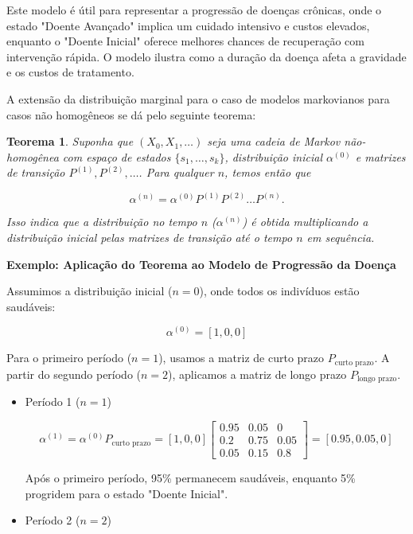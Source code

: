 \documentclass[12pt, a4paper, openany]{book}
\numberwithin{equation}{chapter}
\numberwithin{table}{chapter}
\numberwithin{figure}{chapter}
\theoremstyle{break}
\newtheorem{theorem}{Teorema}[section]
\begin{document}
Este modelo é útil para representar a progressão de doenças crônicas, onde o estado "Doente Avançado" implica um cuidado intensivo e custos elevados, enquanto o "Doente Inicial" oferece melhores chances de recuperação com intervenção rápida. O modelo ilustra como a duração da doença afeta a gravidade e os custos de tratamento.








A extensão da distribuição marginal para o caso de modelos markovianos para casos não homogêneos se dá pelo seguinte teorema:




\begin{theorem}
Suponha que \( (X_0, X_1, \dots) \) seja uma cadeia de Markov não-homogênea com espaço de estados \( \{s_1, \dots, s_k\} \), distribuição inicial \( \alpha^{(0)} \) e matrizes de transição \( P^{(1)}, P^{(2)}, \dots \). Para qualquer \( n \), temos então que

\[
\alpha^{(n)} = \alpha^{(0)} P^{(1)} P^{(2)} \dots P^{(n)}.
\]

Isso indica que a distribuição no tempo \( n \) (\( \alpha^{(n)} \)) é obtida multiplicando a distribuição inicial pelas matrizes de transição até o tempo \( n \) em sequência.
\end{theorem}




\textbf{Exemplo: Aplicação do Teorema ao Modelo de Progressão da Doença}

Assumimos a distribuição inicial (\( n = 0 \)), onde todos os indivíduos estão saudáveis:

\[
\alpha^{(0)} = [1, 0, 0]
\]

Para o primeiro período (\( n = 1 \)), usamos a matriz de curto prazo \( P_{\text{curto prazo}} \). A partir do segundo período (\( n = 2 \)), aplicamos a matriz de longo prazo \( P_{\text{longo prazo}} \).

\begin{itemize}
    \item Período 1 (\( n = 1 \))

\[
\alpha^{(1)} = \alpha^{(0)} P_{\text{curto prazo}} = [1, 0, 0] \begin{bmatrix} 0.95 & 0.05 & 0 \\ 0.2 & 0.75 & 0.05 \\ 0.05 & 0.15 & 0.8 \end{bmatrix} = [0.95, 0.05, 0]
\]

Após o primeiro período, 95\% permanecem saudáveis, enquanto 5\% progridem para o estado "Doente Inicial".



\item Período 2 (\( n = 2 \))

\end{itemize}
\end{document}
